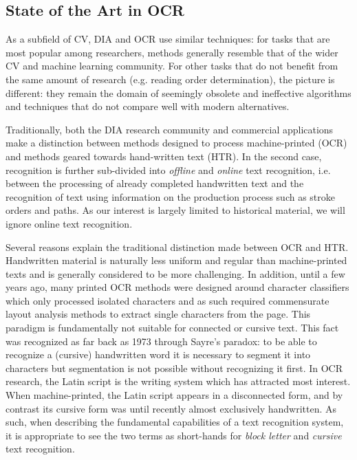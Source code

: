 \subsection{State of the Art in OCR}
\label{s:soa}

As a subfield of CV, DIA and OCR use similar techniques: for tasks that are
most popular among researchers, methods generally resemble that of the wider CV
and machine learning community. For other tasks that do not benefit from the
same amount of research (e.g. reading order determination), the picture is
different: they remain the domain of seemingly obsolete and ineffective
algorithms and techniques that do not compare well with modern alternatives.

Traditionally, both the DIA research community and commercial applications make
a distinction between methods designed to process machine-printed (OCR) and
methods geared towards hand-written text (HTR). In the second case, recognition
is further sub-divided into \emph{offline} and \emph{online} text recognition,
i.e. between the processing of already completed handwritten text and the
recognition of text using information on the production process such as stroke
orders and paths.  As our interest is largely limited to historical material,
we will ignore online text recognition.

Several reasons explain the traditional distinction made between OCR and HTR.
Handwritten material is naturally less uniform and regular than machine-printed
texts and is generally considered to be more challenging. In addition, until a
few years ago, many printed OCR methods were designed around character
classifiers which only processed isolated characters and as such required
commensurate layout analysis methods to extract single characters from the
page. This paradigm is fundamentally not suitable for connected or cursive
text. This fact was recognized as far back as 1973 \cite{sayre1973machine}
through Sayre's paradox: to be able to recognize a (cursive) handwritten word
it is necessary to segment it into characters but segmentation is not possible
without recognizing it first. In OCR research, the Latin script is the writing
system which has attracted most interest. When machine-printed, the Latin
script appears in a disconnected form, and by contrast its cursive form was
until recently almost exclusively handwritten. As such, when describing the
fundamental capabilities of a text recognition system, it is appropriate to see
the two terms as short-hands for \emph{block letter} and \emph{cursive} text
recognition.

